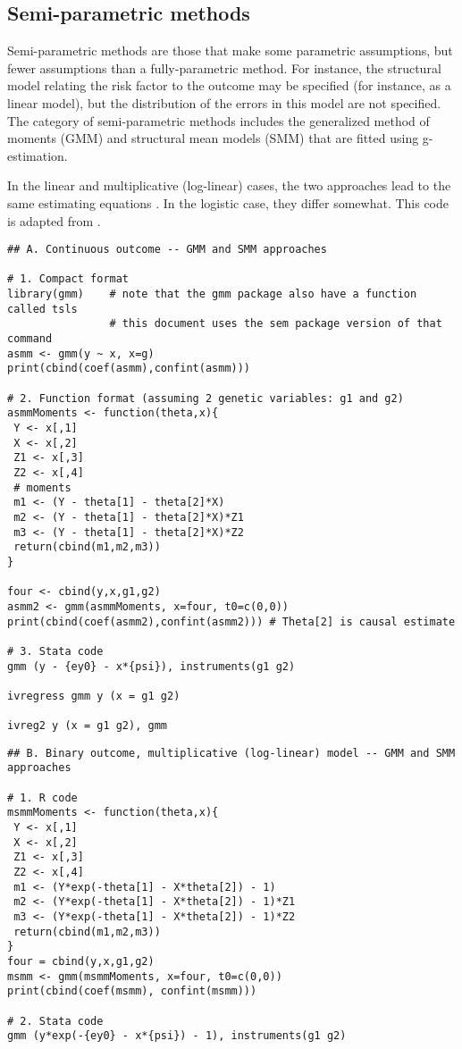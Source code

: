 \documentclass[a4paper,12pt]{article} %
\begin{document}
\clearpage

\subsection{Semi-parametric methods}
Semi-parametric methods are those that make some parametric assumptions, but fewer assumptions than a fully-parametric method. For instance, the structural model relating the risk factor to the outcome may be specified (for instance, as a linear model), but the distribution of the errors in this model are not specified. The category of semi-parametric methods includes the generalized method of moments (GMM) and structural mean models (SMM) that are fitted using g-estimation.

In the linear and multiplicative (log-linear) cases, the two approaches lead to the same estimating equations \citep{clarke2011}. In the logistic case, they differ somewhat. This code is adapted from \cite{clarke2011}.

\begin{lstlisting}
## A. Continuous outcome -- GMM and SMM approaches

# 1. Compact format
library(gmm)    # note that the gmm package also have a function called tsls
                # this document uses the sem package version of that command
asmm <- gmm(y ~ x, x=g)
print(cbind(coef(asmm),confint(asmm)))

# 2. Function format (assuming 2 genetic variables: g1 and g2)
asmmMoments <- function(theta,x){
 Y <- x[,1]
 X <- x[,2]
 Z1 <- x[,3]
 Z2 <- x[,4]
 # moments
 m1 <- (Y - theta[1] - theta[2]*X)
 m2 <- (Y - theta[1] - theta[2]*X)*Z1
 m3 <- (Y - theta[1] - theta[2]*X)*Z2
 return(cbind(m1,m2,m3))
}

four <- cbind(y,x,g1,g2)
asmm2 <- gmm(asmmMoments, x=four, t0=c(0,0))
print(cbind(coef(asmm2),confint(asmm2))) # Theta[2] is causal estimate

# 3. Stata code
gmm (y - {ey0} - x*{psi}), instruments(g1 g2)

ivregress gmm y (x = g1 g2)

ivreg2 y (x = g1 g2), gmm
\end{lstlisting}


\begin{lstlisting}
## B. Binary outcome, multiplicative (log-linear) model -- GMM and SMM approaches

# 1. R code
msmmMoments <- function(theta,x){
 Y <- x[,1]
 X <- x[,2]
 Z1 <- x[,3]
 Z2 <- x[,4]
 m1 <- (Y*exp(-theta[1] - X*theta[2]) - 1)
 m2 <- (Y*exp(-theta[1] - X*theta[2]) - 1)*Z1
 m3 <- (Y*exp(-theta[1] - X*theta[2]) - 1)*Z2
 return(cbind(m1,m2,m3))
}
four = cbind(y,x,g1,g2)
msmm <- gmm(msmmMoments, x=four, t0=c(0,0))
print(cbind(coef(msmm), confint(msmm)))

# 2. Stata code
gmm (y*exp(-{ey0} - x*{psi}) - 1), instruments(g1 g2)
\end{lstlisting}
\end{document}
